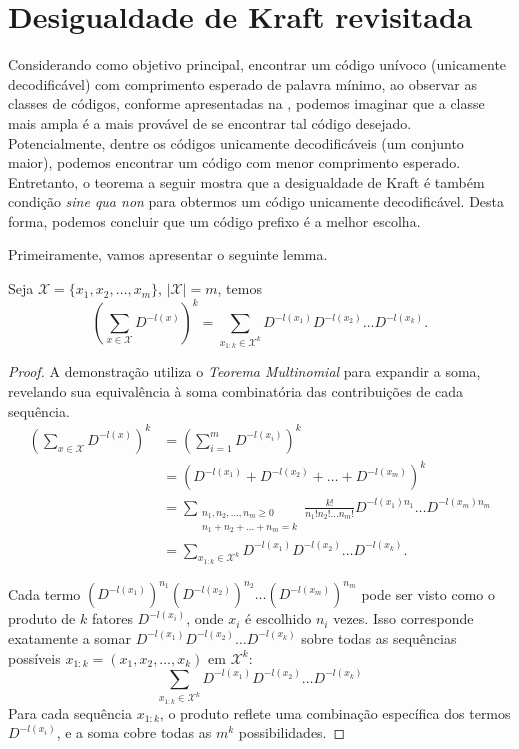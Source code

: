 \section{Desigualdade de Kraft revisitada}
Considerando como objetivo principal, encontrar um código unívoco (unicamente decodificável)
com comprimento esperado de palavra mínimo, ao observar as classes de códigos, conforme
apresentadas na , podemos imaginar que a classe mais ampla é a mais
provável de se encontrar tal código desejado. Potencialmente, dentre os códigos
unicamente decodificáveis (um conjunto maior), podemos encontrar um código com menor comprimento esperado.
Entretanto, o teorema a seguir mostra que a desigualdade de Kraft é também
condição \emph{sine qua non} para obtermos um código unicamente
decodificável. Desta forma, podemos concluir que um código prefixo é a melhor escolha.

Primeiramente, vamos apresentar o seguinte lemma.
\begin{lemma}\label{lm:expmultin}
  Seja $\mathcal{X} = \{x_1, x_2, \ldots, x_m \}$, $\vert \mathcal{X} \vert = m$, temos
  \begin{equation}
    \left( \sum_{x \in \mathcal{X}} D^{-l(x)} \right)^k = \sum_{x_{1:k} \in \mathcal{X}^k} D^{-l(x_1)} D^{-l(x_2)} \ldots D^{-l(x_k)} .
  \end{equation}
\end{lemma}
\begin{proof}
  A demonstração utiliza o \emph{Teorema Multinomial} para expandir a soma, revelando sua equivalência à soma combinatória das contribuições de cada sequência.
  \begin{subequations}
    \begin{align}
    \left( \sum_{x \in \mathcal{X}} D^{-l(x)} \right)^k &= \left( \sum_{i=1}^{m} D^{-l(x_i)} \right)^k \\
        &= \left( D^{-l(x_1)} + D^{-l(x_2)} + \ldots + D^{-l(x_m)}  \right)^k \nonumber \\
        &= \sum_{\substack{ n_1, n_2, \ldots, n_m \geq 0 \\ n_1 + n_2 + \ldots + n_m = k}} \frac{k!}{n_1! n_2! \ldots n_m!} D^{-l(x_1)n_1} \ldots D^{-l(x_m)n_m} \\
        &= \sum_{x_{1:k} \in \mathcal{X}^k} D^{-l(x_1)} D^{-l(x_2)} \ldots D^{-l(x_k)} .
    \end{align}
  \end{subequations}

  Cada termo $(D^{-l(x_1)})^{n_1} (D^{-l(x_2)})^{n_2} \ldots (D^{-l(x_m)})^{n_m}$ 
  pode ser visto como o produto de $k$ fatores $D^{-l(x_i)}$, onde $x_i$ é escolhido $n_i$ vezes. 
  Isso corresponde exatamente a somar $D^{-l(x_1)} D^{-l(x_2)} \ldots D^{-l(x_k)}$ 
  sobre todas as sequências possíveis $x_{1:k} = (x_1, x_2, \ldots, x_k)$ em $\mathcal{X}^k$:
  \[
  \sum_{x_{1:k} \in \mathcal{X}^k} D^{-l(x_1)} D^{-l(x_2)} \ldots D^{-l(x_k)}
  \]
  Para cada sequência $x_{1:k}$, o produto reflete uma combinação específica dos termos $D^{-l(x_i)}$, e a soma cobre todas as $m^k$ possibilidades.
\end{proof}


